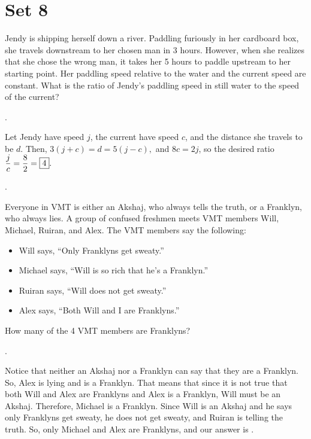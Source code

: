 \documentclass[11pt]{article}
\DeclareRobustCommand{\frac}[3][0pt]{%
  {\begingroup\hspace{#1}#2\hspace{#1}\endgroup\over\hspace{#1}#3\hspace{#1}}}
\begin{document}
\eject

\section*{Set 8}

\begin{problem}
Jendy is shipping herself down a river. Paddling furiously in her cardboard box, she travels downstream to her chosen man in 3 hours. 
However, when she realizes that she chose the wrong man, it takes her 5 hours to paddle upstream to her starting point. Her paddling speed relative to the water
and the current speed are constant. What is the ratio of Jendy's paddling speed in still water to the speed of the current?
\end{problem}

\begin{answer} . \end{answer}
\begin{solution}
Let Jendy have speed $j$, the current have speed $c$, and the distance she travels to be $d$. Then, $3(j + c) = d = 5(j- c),$ and $8c = 2j$, so the desired ratio $\displaystyle \frac{j}{c} = \frac{8}{2} = \boxed{4}.$
\end{solution}.

\begin{problem}
Everyone in VMT is either an Akshaj, who always tells the truth, or a Franklyn, who always lies. A group of confused freshmen meets VMT members Will, Michael, Ruiran, and Alex. The VMT members say the following:
	\begin{itemize}
    	\item Will says, ``Only Franklyns get sweaty.''
    	\item Michael says, ``Will is so rich that he's a Franklyn.''
    	\item Ruiran says, ``Will does not get sweaty.''
    	\item Alex says, ``Both Will and I are Franklyns.''
	\end{itemize}
	How many of the 4 VMT members are Franklyns?
\end{problem}

\begin{answer} . \end{answer}
\begin{solution}
Notice that neither an Akshaj nor a Franklyn can say that they are a Franklyn. So, Alex is lying and is a Franklyn. That means that since it is not true that both Will and Alex are Franklyns and Alex is a Franklyn, Will must be an Akshaj. Therefore, Michael is a Franklyn. Since Will is an Akshaj and he says only Franklyns get sweaty, he does not get sweaty, and Ruiran is telling the truth. So, only Michael and Alex are Franklyns, and our answer is .
\end{solution}
\end{document}
